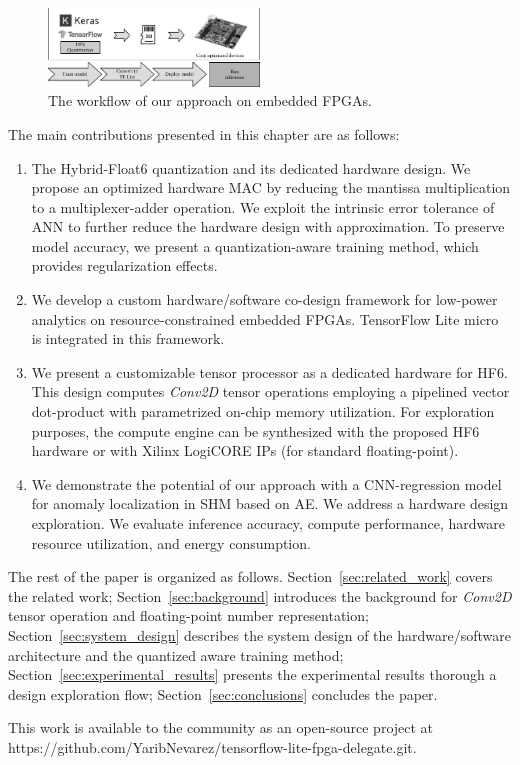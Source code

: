 \begin{figure}[t!]
	\centering
	\includegraphics[width=0.5\textwidth]{./chapters/cnn_accelerator/figures/workflow.pdf}
	\caption{The workflow of our approach on embedded FPGAs.}
	\label{fig:workflow}
\end{figure}

The main contributions presented in this chapter are as follows:
\begin{enumerate}
	\item
	
	The Hybrid-Float6 quantization and its dedicated hardware design. We propose an optimized hardware MAC by reducing the mantissa multiplication to a multiplexer-adder operation. We exploit the intrinsic error tolerance of ANN to further reduce the hardware design with approximation. To preserve model accuracy, we present a quantization-aware training method, which provides regularization effects.
	
	\item We develop a custom hardware/software co-design framework for low-power analytics on resource-constrained embedded FPGAs. TensorFlow Lite micro is integrated in this framework.
	\item We present a customizable tensor processor as a dedicated hardware for HF6. This design computes \emph{Conv2D} tensor operations employing a pipelined vector dot-product with parametrized on-chip memory utilization. For exploration purposes, the compute engine can be synthesized with the proposed HF6 hardware or with Xilinx LogiCORE IPs (for standard floating-point).
	\item We demonstrate the potential of our approach with a CNN-regression model for anomaly localization in SHM based on AE. We address a hardware design exploration. We evaluate inference accuracy, compute performance, hardware resource utilization, and energy consumption.
\end{enumerate}

The rest of the paper is organized as follows. Section~\ref{sec:related_work} covers the related work; Section~\ref{sec:background} introduces the background for \emph{Conv2D} tensor operation and floating-point number representation; Section~\ref{sec:system_design} describes the system design of the hardware/software architecture and the quantized aware training method; Section~\ref{sec:experimental_results} presents the experimental results thorough a design exploration flow; Section~\ref{sec:conclusions} concludes the paper.

This work is available to the community as an open-source project at https://github.com/YaribNevarez/tensorflow-lite-fpga-delegate.git.